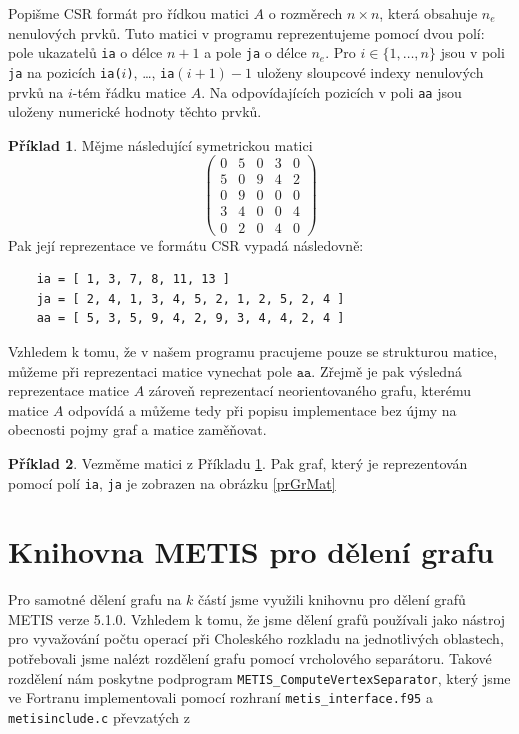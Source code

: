 \documentclass{ctuthesis}
\theoremstyle{plain}
\theoremstyle{definition}
\newtheorem{example}{Příklad}
\begin{document}
Popišme CSR formát pro řídkou matici $A$ o rozměrech $n \times n$, která obsahuje $n_e$ nenulových prvků. Tuto matici v programu reprezentujeme pomocí dvou polí: pole ukazatelů \texttt{ia} o délce $n+1$ a pole \texttt{ja} o délce $n_e$. Pro $i\in\{1,\ldots,n\}$ jsou v poli \texttt{ja} na pozicích \texttt{ia($i$)}, \ldots, \texttt{ia$(i+1)-1$} uloženy sloupcové indexy nenulových prvků na $i$-tém řádku matice $A$. Na odpovídajících pozicích v poli \texttt{aa} jsou uloženy numerické hodnoty těchto prvků.

\begin{example}
  \label{CSRexample}
  Mějme následující symetrickou matici
  \[
    \begin{pmatrix}
      0 & 5 & 0 & 3 & 0 \\
      5 & 0 & 9 & 4 & 2 \\
      0 & 9 & 0 & 0 & 0 \\
      3 & 4 & 0 & 0 & 4 \\
      0 & 2 & 0 & 4 & 0
    \end{pmatrix}
  \]
  Pak její reprezentace ve formátu CSR vypadá následovně:
  \begin{verbatim}
    ia = [ 1, 3, 7, 8, 11, 13 ]
    ja = [ 2, 4, 1, 3, 4, 5, 2, 1, 2, 5, 2, 4 ]
    aa = [ 5, 3, 5, 9, 4, 2, 9, 3, 4, 4, 2, 4 ]
  \end{verbatim}
\end{example}

Vzhledem k tomu, že v našem programu pracujeme pouze se strukturou matice, můžeme při reprezentaci matice vynechat pole $\texttt{aa}$. Zřejmě je pak výsledná reprezentace matice $A$ zároveň reprezentací neorientovaného grafu, kterému matice $A$ odpovídá a můžeme tedy při popisu implementace bez újmy na obecnosti pojmy graf a matice zaměňovat.

\begin{example}
  Vezměme matici z Příkladu \ref{CSRexample}. Pak graf, který je reprezentován pomocí polí \texttt{ia}, \texttt{ja} je zobrazen na obrázku \ref{prGrMat}
\end{example}

\section{Knihovna METIS pro dělení grafu}

Pro samotné dělení grafu na $k$ částí jsme využili knihovnu pro dělení grafů METIS \cite{kary:13} verze 5.1.0. Vzhledem k tomu, že jsme dělení grafů používali jako nástroj pro vyvažování počtu operací při Choleského rozkladu na jednotlivých oblastech, potřebovali jsme nalézt rozdělení grafu pomocí vrcholového separátoru. Takové rozdělení nám poskytne podprogram \texttt{METIS\_ComputeVertexSeparator}, který jsme ve Fortranu implementovali pomocí rozhraní \texttt{metis\_interface.f95} a \texttt{metisinclude.c} převzatých z \cite{klforum1}
\end{document}
